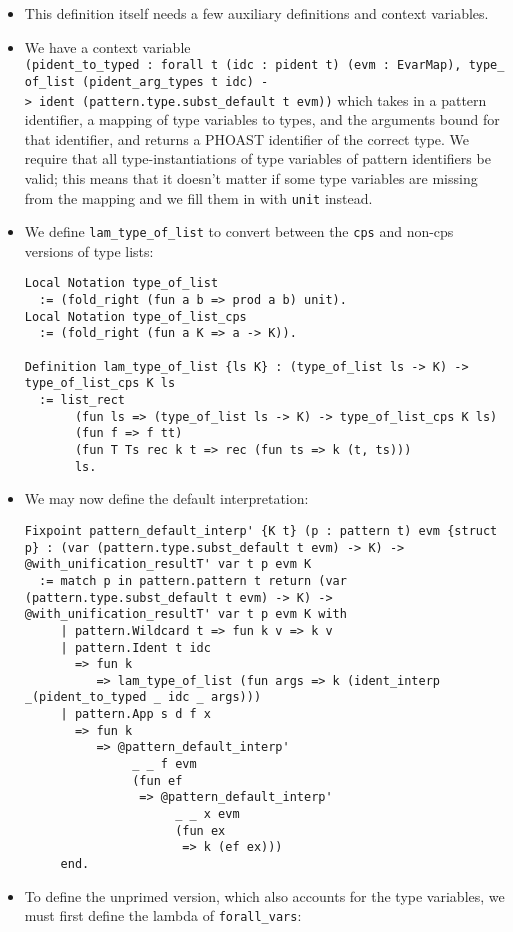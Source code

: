 \begin{itemize}
\begin{itemize}
\begin{itemize}
\begin{itemize}
\begin{itemize}
\begin{itemize}
            \begin{itemize}
            \item
              This definition itself needs a few auxiliary definitions
              and context variables.
            \item
              We have a context variable
              \texttt{(pident\_to\_typed\ :\ forall\ t\ (idc\ :\ pident\ t)\ (evm\ :\ EvarMap),\ type\_of\_list\ (pident\_arg\_types\ t\ idc)\ -\textgreater{}\ ident\ (pattern.type.subst\_default\ t\ evm))}
              which takes in a pattern identifier, a mapping of type
              variables to types, and the arguments bound for that
              identifier, and returns a PHOAST identifier of the correct
              type. We require that all type-instantiations of type
              variables of pattern identifiers be valid; this means that
              it doesn't matter if some type variables are missing from
              the mapping and we fill them in with \texttt{unit}
              instead.
            \item
              We define \texttt{lam\_type\_of\_list} to convert between
              the \texttt{cps} and non-cps versions of type lists:

\begin{verbatim}
Local Notation type_of_list
  := (fold_right (fun a b => prod a b) unit).
Local Notation type_of_list_cps
  := (fold_right (fun a K => a -> K)).

Definition lam_type_of_list {ls K} : (type_of_list ls -> K) -> type_of_list_cps K ls
  := list_rect
       (fun ls => (type_of_list ls -> K) -> type_of_list_cps K ls)
       (fun f => f tt)
       (fun T Ts rec k t => rec (fun ts => k (t, ts)))
       ls.
\end{verbatim}
            \item
              We may now define the default interpretation:

\begin{verbatim}
Fixpoint pattern_default_interp' {K t} (p : pattern t) evm {struct p} : (var (pattern.type.subst_default t evm) -> K) -> @with_unification_resultT' var t p evm K
  := match p in pattern.pattern t return (var (pattern.type.subst_default t evm) -> K) -> @with_unification_resultT' var t p evm K with
     | pattern.Wildcard t => fun k v => k v
     | pattern.Ident t idc
       => fun k
          => lam_type_of_list (fun args => k (ident_interp _(pident_to_typed _ idc _ args)))
     | pattern.App s d f x
       => fun k
          => @pattern_default_interp'
               _ _ f evm
               (fun ef
                => @pattern_default_interp'
                     _ _ x evm
                     (fun ex
                      => k (ef ex)))
     end.
\end{verbatim}
            \item
              To define the unprimed version, which also accounts for
              the type variables, we must first define the lambda of
              \texttt{forall\_vars}:


\end{itemize}
\end{itemize}
\end{itemize}
\end{itemize}
\end{itemize}
\end{itemize}
\end{itemize}
